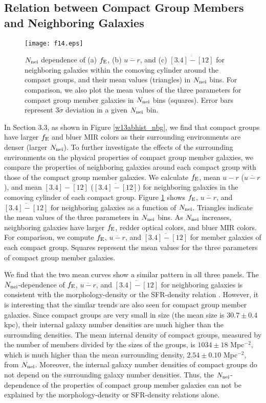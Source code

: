 \documentclass[12pt,preprint,apj]{emulateapj}
\newcommand{\efrac}{f_{\rm E}}
\newcommand{\nbg}{N_{\rm nei}}
\begin{document}
\subsection{Relation between Compact Group Members and Neighboring 
Galaxies}

\begin{figure*}
\centering
\texttt{[image: f14.eps]}
\caption{$\nbg$ dependence of (a) $\efrac$, (b) $\overline{u-r}$, and 
(c) $\overline{[3.4]-[12]}$ for neighboring galaxies within the 
comoving cylinder around the compact groups, and their mean values (triangles) 
in $\nbg$ bins.
For comparison, we also plot the mean values of the three parameters 
for compact group member galaxies in $\nbg$ bins (squares).
Error bars represent $3\sigma$ deviation in a given $\nbg$ bin.
}
\label{nbg_bg_properties}
\end{figure*}

In Section 3.3, as shown in Figure \ref{w13abhist_nbg}, 
we find that compact groups have larger $\efrac$ 
and bluer MIR colors as their surrounding environments are denser (larger $\nbg$). 
To further investigate the effects of the surrounding environments on 
the physical properties of compact group member galaxies,
we compare the properties of neighboring galaxies around each compact group 
with those of the compact group member galaxies.
We calculate $\efrac$, mean $u-r$ ($\overline{u-r}$), and mean $[3.4]-[12]$ 
($\overline{[3.4]-[12]}$) for neighboring galaxies in the comoving cylinder of 
each compact group. 
Figure \ref{nbg_bg_properties} shows $\efrac$, $\overline{u-r}$, and 
$\overline{[3.4]-[12]}$ for neighboring galaxies as a function of $\nbg$. 
Triangles indicate the mean values of the three parameters in $\nbg$ bins.
As $\nbg$ increases, neighboring galaxies have larger $\efrac$, 
redder optical colors, and bluer MIR colors.
For comparison, we compute $\efrac$, $\overline{u-r}$, and $\overline{[3.4]-[12]}$ 
for member galaxies of each compact  group. Squares represent the 
mean values for the three parameters of compact group member galaxies.

We find that the two mean curves show a similar pattern in all three panels. 
The $\nbg$-dependence of $\efrac$, $\overline{u-r}$, and $\overline{[3.4]-[12]}$ 
for neighboring galaxies is consistent with the morphology-density or 
the SFR-density relation \citep[e.g.,][]{dressler80,lewis+02,park+09}.
However, it is interesting that the similar trends are also seen for compact group 
member galaxies. Since compact groups are very small in size (the mean size 
is $30.7\pm0.4$ kpc), their internal galaxy number densities are much higher 
than the surrounding densities. The mean internal density of compact groups, 
measured by the number of members divided by the sizes of the groups, is 
$1034\pm18$ Mpc$^{-2}$, which is much higher than the mean surrounding density,
$2.54\pm0.10$ Mpc$^{-2}$, from $\nbg$. 
Moreover, the internal galaxy number densities
of compact groups do not depend on the surrounding galaxy number densities. 
Thus, the $\nbg$-dependence of the properties of compact group member galaxies 
can not be explained by the morphology-density or SFR-density relations alone.
\end{document}
